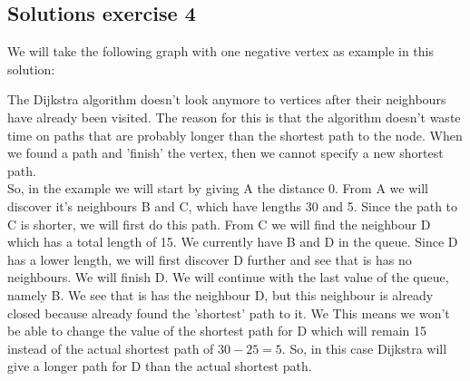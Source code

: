 \documentclass{article}
\begin{document}
\subsection*{Solutions exercise 4}
We will take the following graph with one negative vertex as example in this solution:
\begin{center}
\end{center}

The Dijkstra algorithm doesn't look anymore to vertices after their neighbours have already been visited. The reason for this is that the algorithm doesn't waste time on paths that are probably longer than the shortest path to the node. When we found a path and 'finish' the vertex, then we cannot specify a new shortest path. \\
So, in the example we will start by giving A the distance 0. From A we will discover it's neighbours B and C, which have lengths 30 and 5. Since the path to C is shorter, we will first do this path. From C we will find the neighbour D which has a total length of 15. We currently have B and D in the queue. Since D has a lower length, we will first discover D further and see that is has no neighbours. We will finish D. We will continue with the last value of the queue, namely B. We see that is has the neighbour D, but this neighbour is already closed because already found the 'shortest' path to it. We This means we won't be able to change the value of the shortest path for D which will remain 15 instead of the actual shortest path of $30 - 25 = 5$. So, in this case Dijkstra will give a longer path for D than the actual shortest path.
\newpage
\end{document}
